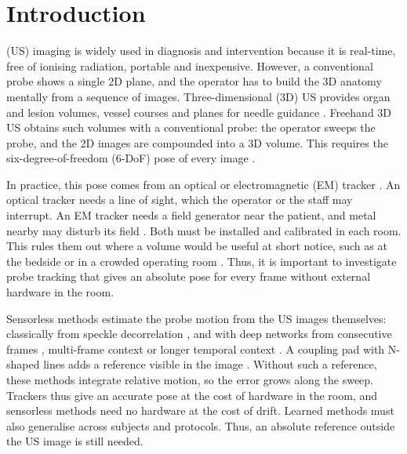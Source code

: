 \documentclass[9pt,shortpaper,twoside,web]{ieeecolor2}
\begin{document}
\section{Introduction}
\label{sec:introduction}

 (US) imaging is widely used in diagnosis and intervention because it is real-time, free of ionising radiation, portable and inexpensive. However, a conventional probe shows a single 2D plane, and the operator has to build the 3D anatomy mentally from a sequence of images. Three-dimensional (3D) US provides organ and lesion volumes, vessel courses and planes for needle guidance \cite{Jiang2023}. Freehand 3D US obtains such volumes with a conventional probe: the operator sweeps the probe, and the 2D images are compounded into a 3D volume. This requires the six-degree-of-freedom (6-DoF) pose of every image \cite{solberg2007freehand}.

In practice, this pose comes from an optical or electromagnetic (EM) tracker \cite{solberg2007freehand}. An optical tracker needs a line of sight, which the operator or the staff may interrupt. An EM tracker needs a field generator near the patient, and metal nearby may disturb its field \cite{sorriento2019optical}. Both must be installed and calibrated in each room. This rules them out where a volume would be useful at short notice, such as at the bedside or in a crowded operating room \cite{blaivas2004bedside}. Thus, it is important to investigate probe tracking that gives an absolute pose for every frame without external hardware in the room.

Sensorless methods estimate the probe motion from the US images themselves: classically from speckle decorrelation \cite{gee2006sensorless}, and with deep networks from consecutive frames \cite{prevost2018}, multi-frame context \cite{guo2023tbme} or longer temporal context \cite{li2024longterm}. A coupling pad with N-shaped lines adds a reference visible in the image \cite{dai2024coupling}. Without such a reference, these methods integrate relative motion, so the error grows along the sweep. Trackers thus give an accurate pose at the cost of hardware in the room, and sensorless methods need no hardware at the cost of drift. Learned methods must also generalise across subjects and protocols. Thus, an absolute reference outside the US image is still needed.
\end{document}
